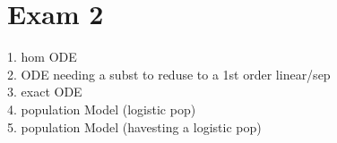 \documentclass[10pt,a4paper]{article}
\begin{document}
\section*{Exam 2}
  1. hom ODE \\
  2. ODE needing a subst to reduse to a 1st order linear/sep \\
  3. exact ODE \\
  4. population Model (logistic pop) \\
  5. population Model (havesting a logistic pop) \\ 




  
\end{document}
